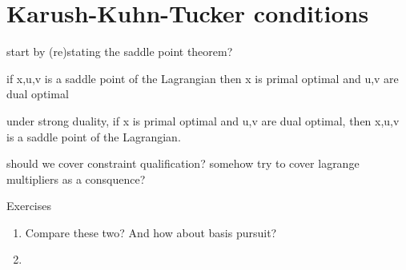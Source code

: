 \chapter{Karush-Kuhn-Tucker conditions}
\label{chap:kkt_conditions}

start by (re)stating the saddle point theorem?

if x,u,v is a saddle point of the Lagrangian then x is primal optimal and u,v
are dual optimal

under strong duality, if x is primal optimal and u,v are dual optimal, then
x,u,v is a saddle point of the Lagrangian.

should we cover constraint qualification? 
somehow try to cover lagrange multipliers as a consquence?


\begin{xcb}{Exercises}
\begin{enumerate}[label=\thechapter.\arabic*]
\settowidth{\leftmargini}{00.00.\hskip\labelsep}
\item \label{ex:lasso_dantzig}
Compare these two? And how about basis pursuit?

\item \label{ex:simplex_projection}

\end{enumerate}
\end{xcb}
